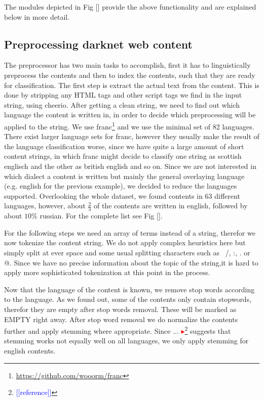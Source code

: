 \documentclass[USenglish,oneside,twocolumn]{article}
\newcommand{\nb}[1]{\textcolor{red}{$\blacktriangleright$}\footnote{\textcolor{blue}{[[#1]]}}}
\begin{document}
The modules depicted in Fig [] provide the above functionality and are explained below in more detail.

\subsection{Preprocessing darknet web content}
The preprocessor has two main tasks to accomplish, first it has to linguistically preprocess the contents and then to index the contents, such that they are ready for classification. 
The first step is  extract the actual text from the content. This is done by stripping any HTML tags and other script tags we find in the input string, using cheerio. After getting a clean string, we need to find out which language the content is written in, in order to decide which preprocessing will be applied to the string. We use franc\footnote{\href{https://github.com/wooorm/franc}{https://github.com/wooorm/franc}} and we use the minimal set of 82 languages. There exist larger language sets for franc, however they usually make the result of the language classification worse, since we have quite a large amount of short content strings, in which franc might decide to classify one string as scottish englisch and the other as british english and so on. Since we are not interested in which dialect a content is written but mainly the general overlaying language (e.g. english for the previous example), we decided to reduce the languages supported. Overlooking the whole dataset, we found contents in 63 different languages, however, about $\frac{2}{3}$ of the contents are written in english, followed by about $10\%$ russian. For the complete list see Fig [].

For the following steps we need an array of terms instead of a string, therefor we now tokenize the content string. We do not apply complex heuristics here but simply split at ever space and some usual splitting characters such as \, /, :, . or @. Since we have no precise information about the topic of the string,it is hard to apply more sophisticated tokenization at this point in the process.

Now that the language of the content is known, we remove stop words according to the language. As we found out, some of the contents only contain stopwords, therefor they are empty after stop words removal. These will be marked as EMPTY right away.
After stop word removal we do normalize the contents further and apply stemming where appropriate. Since ... \nb{reference} suggests that stemming works not equally well on all languages, we only apply stemming for english contents.
\end{document}
